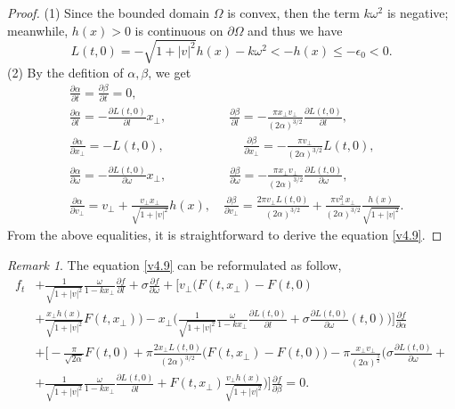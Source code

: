 \documentclass[11pt,reqno]{amsart}%
\theoremstyle{definition}
\theoremstyle{remark}
\newtheorem{Remark}{Remark}[section]
\begin{document}
\begin{proof}
(1) Since the bounded domain $\Omega$ is convex, then the term $k \omega^{2}$ is negative; meanwhile, $h(x)>0$ is continuous  on $\partial\Omega$ and thus we have
$$L(t,0)=-\sqrt{1+|v|^{2}}h(x)-k\omega^{2}< -h(x)\leq -\epsilon_{0}<0.$$
(2) By the defition of $\alpha, \beta$, we get
\begin{align}
&\frac{\partial \alpha}{\partial t}= \frac{\partial \beta}{\partial t}=0, \nonumber\\
&\frac{\partial \alpha}{\partial l}=-\frac{\partial L(t,0)}{\partial l}x_{\bot},\quad\qquad  \qquad\frac{\partial \beta}{\partial l}=-\frac{\pi x_{\bot}v_{\bot}}{(2\alpha)^{3/2}}\frac{\partial L(t,0)}{\partial l},\nonumber\\
&\frac{\partial \alpha}{\partial x_{\bot}}=- L(t,0),\,\,\qquad \qquad \qquad\frac{\partial \beta}{\partial x_{\bot}}=-\frac{\pi v_{\bot}}{(2\alpha)^{3/2}} L(t,0),\nonumber\\
&\frac{\partial \alpha}{\partial \omega}=-\frac{\partial L(t,0)}{\partial \omega}x_{\bot},\quad \quad \qquad\quad\frac{\partial \beta}{\partial \omega}=-\frac{\pi x_{\bot}v_{\bot}}{(2\alpha)^{3/2}}\frac{\partial L(t,0)}{\partial \omega},\nonumber\\
&\frac{\partial \alpha}{\partial v_{\bot}}=v_{\bot}+\frac{v_{\bot} x_{\bot}}{\sqrt{1+|v|^{2}}}h(x),\quad  \frac{\partial \beta}{\partial v_{\bot}}
=\frac{2\pi v_{\bot}L(t,0)}{(2\alpha)^{3/2}} +\frac{\pi v^{2}_{\bot}x_{\bot}}{(2\alpha)^{3/2}}\frac{h(x)}{\sqrt{1+|v|^{2}}}.\nonumber
\end{align}
From the above equalities, it is straightforward to derive the equation \eqref{v4.9}.  
\end{proof}

\begin{Remark}
The equation \eqref{v4.9} can be reformulated as follow,
\begin{align}
  f_{t}&+\frac{1}{\sqrt{1+|v|^{2}}}\frac{\omega}{1-kx_{\bot}}\frac{\partial f}{\partial l}+\sigma \frac{\partial f}{\partial \omega}
  +\Big[v_{\bot}\Big(F(t,x_{\bot})-F(t,0)\nonumber\\
  &+\frac{x_{\bot}h(x)}{\sqrt{1+|v|^{2}}}F(t,x_{\bot})\Big)
  -x_{\bot}\Big(\frac{1}{\sqrt{1+|v|^{2}}}\frac{\omega}{1-kx_{\bot}}\frac{\partial L(t,0)}{\partial l}+\sigma \frac{\partial L(t,0)}{\partial \omega}(t,0)\Big)\Big]\frac{\partial f}{\partial\alpha}\nonumber\\
  &+\Big[-\frac{\pi}{\sqrt{2\alpha}}F(t,0)+\pi\frac{2x_{\bot}L(t,0)}{(2\alpha)^{3/2}}\big(F(t,x_{\bot})-F(t,0)\big)-\pi \frac{x_{\bot}v_{\bot}}{(2\alpha)^{\frac{3}{2}}}
 \Big(\sigma \frac{\partial L(t,0)}{\partial\omega}+\nonumber\\
   &+\frac{1}{\sqrt{1+|v|^{2}}}\frac{\omega}{1-k x_{\bot}}
  \frac{\partial L(t,0)}{\partial l}+F(t,x_{\bot})\frac{v_{\bot}h(x)}{\sqrt{1+|v|^{2}}}\Big)\Big]\frac{\partial f}{\partial\beta}=0. \label{v4.10}
  \end{align}
\end{Remark}
\end{document}
